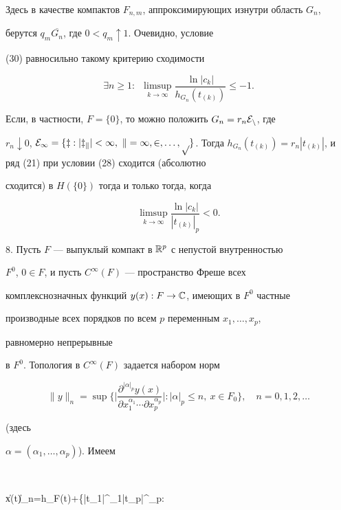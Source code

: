 Здесь в качестве компактов $F_{n,m}$, аппроксимирующих изнутри область $G_n$,


берутся $q_m\overline{G_n}$, где $0<q_m\uparrow 1$. Очевидно, условие


(30) равносильно такому критерию сходимости


$$


\exists n\geqslant 1:\ \;


\limsup\limits_{k\to\infty}\dfrac{\ln|c_k|}{h_{G_n}(t_{(k)})}


\leqslant -1.


$$


Если, в частности, $F=\{0\}$, то можно положить $G_n=r_n\cal E_n$, где


$r_n\downarrow 0$, $\cal E_1=\{z:|z_k|<1,\ k=1,2,\dotsc,p\}$. Тогда $h_{G_n}


(t_{(k)})=r_n|t_{(k)}|$, и ряд (21) при условии (28) сходится (абсолютно


сходится) в $H(\{0\})$ тогда и только тогда, когда


$$


\limsup\limits_{k\to\infty}\dfrac{\ln|c_k|}{|t_{(k)}|_p}<0.


$$





8. Пусть $F$ --- выпуклый компакт в $\Bbb R^p$ с непустой внутренностью


$F^0$, $0\in F$, и пусть $C^\infty(F)$ --- пространство Фреше всех


комплекснозначных функций $y(x):F\to\Bbb C$, имеющих в $F^0$ частные


производные всех порядков по всем $p$ переменным $x_1,\dots,x_p$,


равномерно непрерывные


в $F^0$. Топология в $C^\infty (F)$ задается набором норм


$$


\|y\|_n=\sup\bigg\{\bigg|\dfrac{\partial^{|\alpha|_p}y(x)}


{\partial x_1^{\alpha_1}\dotsb \partial x_p^{\alpha_p}}\bigg|:|\alpha|_p


\leqslant n,\ x\in F_0\bigg\}, \quad n=0,1,2,\dotsc


$$


(здесь


$\alpha=(\alpha_1,\dots,\alpha_p)$). Имеем 


$$


\ln\|x(t)\|_n=h_F(t)+\ln\max\{|t_1|^{\alpha_1}\dotsb |t_p|^{\alpha_p}:


